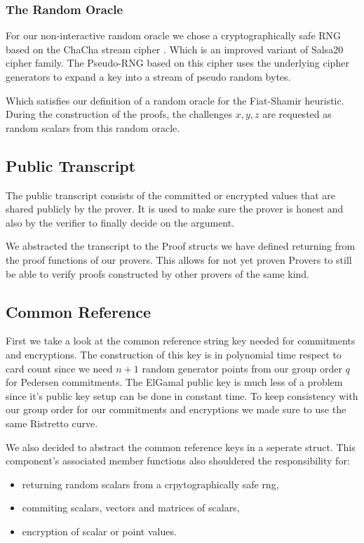\documentclass[12pt,a4paper]{report}
\begin{document}
\subsubsection{The Random Oracle}
For our non-interactive random oracle we chose a cryptographically safe RNG based on the ChaCha stream cipher \cite{cha}. 
Which is an improved variant of Salsa20 \cite{salsa} cipher family. 
The Pseudo-RNG based on this cipher uses the underlying cipher generators to expand a key into a stream of pseudo random bytes.\par
Which satisfies our definition of a random oracle for the Fiat-Shamir heuristic. During the construction of the proofs, the challenges $x, y, z$ are requested as random scalars from this random oracle.
\subsection*{Public Transcript}
The public transcript consists of the committed or encrypted values that are shared publicly by the prover. 
It is used to make sure the prover is honest and also by the verifier to finally decide on the argument.\par
We abstracted the transcript to the Proof structs we have defined returning from the proof functions of our provers. This allows for not yet proven Provers to still be able to verify proofs constructed by other provers of the same kind.
\subsection*{Common Reference}
First we take a look at the common reference string key needed for commitments and encryptions. 
The construction of this key is in polynomial time respect to card count since we need $n+1$ random generator points from our group order $q$ for Pedersen commitments. 
The ElGamal public key is much less of a problem since it's public key setup can be done in constant time.
To keep consistency with our group order for our commitments and encryptions we made sure to use the same Ristretto curve.\par
We also decided to abstract the common reference keys in a seperate struct. 
This component's associated
member functions also shouldered the responsibility for: 
\begin{itemize}
	\item returning random scalars from a crpytographically safe rng, 
	\item commiting scalars, vectors and matrices of scalars, 
	\item encryption of scalar or point values.
\end{itemize}
\end{document}
